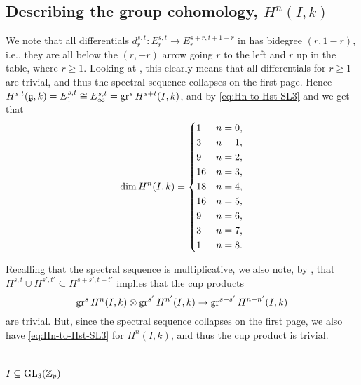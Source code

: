 \subsection{Describing the group cohomology, \texorpdfstring{$H^{n}(I,k)$}{Hn(I,k)}}%
\label{subsec:group-coh-SL3}

We note that all differentials $d_{r}^{s,t} \colon E_{r}^{s,t} \to E_{r}^{s+r,t+1-r}$ in  has bidegree $(r,1-r)$, i.e., they are all below the $(r,-r)$ arrow going $r$ to the left and $r$ up in the table, where $r \geq 1$. Looking at , this clearly means that all differentials for $r \geq 1$ are trivial, and thus the spectral sequence collapses on the first page. Hence $H^{s,t}(\mathfrak{g},k) = E_{1}^{s,t} \cong E_{\infty}^{s,t} = \operatorname{gr}^{s} H^{s+t}(I,k)$, and by \eqref{eq:Hn-to-Hst-SL3} and  we get that
\begin{equation}
  \label{eq:dim-HnI-SL3}
  \dim H^{n}(I,k) =
  \begin{dcases}
    1 & n=0, \\
    3 & n=1, \\
    9 & n=2, \\
    16 & n=3, \\
    18 & n=4, \\
    16 & n=5, \\
    9 & n=6, \\
    3 & n=7, \\
    1 & n=8.
  \end{dcases}
\end{equation}

Recalling that the spectral sequence is multiplicative, we also note, by , that $H^{s,t} \cup H^{s',t'} \subseteq H^{s+s',t+t'}$ implies that the cup products
\begin{equation*}
  \operatorname{gr}^{s} H^{n}(I,k) \otimes \operatorname{gr}^{s'} H^{n'}(I,k) \to \operatorname{gr}^{s+s'} H^{n+n'}(I,k)
\end{equation*}
are trivial. But, since the spectral sequence collapses on the first page, we also have \eqref{eq:Hn-to-Hst-SL3} for $H^{n}(I,k)$, and thus the cup product is trivial.

\section{\texorpdfstring{$I \subseteq \operatorname{GL}_{3}(\mathbb{Z}_{p})$}{I in GL3(Zp)}}%
\label{sec:Iwa-GL3}

